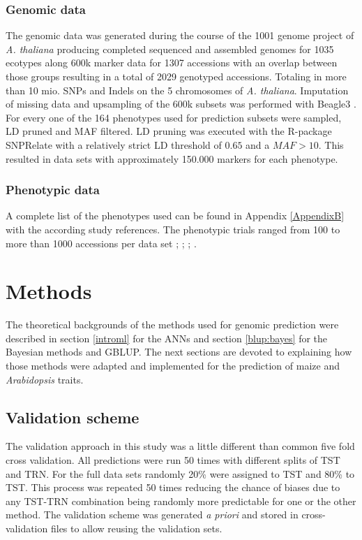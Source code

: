 \subsubsection{Genomic data}

The genomic data was generated during the course of the 1001 genome project of
\textit{A. thaliana} \cite{1001genome} producing completed sequenced and assembled genomes
for 1035 ecotypes along 600k marker data for 1307 accessions with an overlap between those
groups resulting in a total of 2029 genotyped accessions. Totaling in more than 10
mio. SNPs and Indels on the 5 chromosomes of \textit{A. thaliana}. Imputation of missing
data and upsampling of the 600k subsets was performed with Beagle3
\cite{browning2007rapid}. \\
For every one of the 164 phenotypes used for prediction subsets were sampled, LD pruned
and MAF filtered. LD pruning was executed with the R-package SNPRelate
\cite{zheng2013tutorial} with a relatively strict LD threshold of $0.65$ and a
$MAF > 10 $. This resulted in data sets with approximately 150.000 markers for each
phenotype.

\subsubsection{Phenotypic data}
A complete list of the phenotypes used can be found in Appendix \ref{AppendixB} with the
according study references. The phenotypic trials ranged from 100 to more than 1000
accessions per data set \cite{atwell2010}; \cite{li2010}; \cite{me2014}; \cite{strauch2015}.



\section{Methods}

The theoretical backgrounds of the methods used for genomic prediction were described in
section \ref{introml} for the ANNs and section \ref{blup:bayes} for the Bayesian methods
and GBLUP. The next sections are devoted to explaining how those methods were adapted and
implemented for the prediction of maize and \textit{Arabidopsis} traits.

\subsection{Validation scheme} \label{cv}

The validation approach in this study was a little different than common five fold cross
validation. All predictions were run 50 times with different splits of TST and TRN. For
the full data sets randomly 20\% were assigned to TST and 80\% to TST. This process was
repeated 50 times reducing the chance of biases due to any TST-TRN combination being
randomly more predictable for one or the other method. The validation scheme was generated
\textit{a priori} and stored in cross-validation files to allow reusing the validation
sets.

